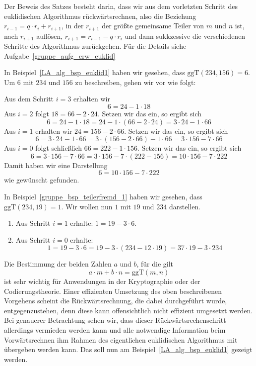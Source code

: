 Der Beweis des Satzes besteht darin, dass wir aus dem vorletzten Schritt des euklidischen Algorithmus 
rückwärtsrechnen, also die Beziehung $r_{i-1} = q \cdot r_i + r_{i+1}$, in der $r_{i+1}$ der größte 
gemeinsame Teiler von $m$ und $n$ ist, nach $r_{i+1}$ auflösen, $r_{i+1} = r_{i-1} - q \cdot r_i$ und dann 
sukkzessive die verschiedenen Schritte des Algorithmus zurückgehen. Für die Details siehe 
Aufgabe~\ref{gruppe_aufg_erw_euklid}

\begin{beispiel}
In Beispiel~\ref{LA_alg_bsp_euklid1} haben wir gesehen, dass $\mathrm{ggT}(234,156) = 6$. Um $6$ mit 
$234$ und $156$ zu beschreiben, gehen wir vor wie folgt: 

Aus dem Schritt $i = 3$ erhalten wir 
	$$ 6 = 24 - 1 \cdot 18 $$
Aus $i =2$ folgt $18 = 66 - 2 \cdot 24$. Setzen wir das ein, so ergibt sich 
	$$ 6 = 24 - 1 \cdot 18 = 24 - 1 \cdot (66 - 2 \cdot 24) = 3 \cdot 24 - 1 \cdot 66 $$
  Aus $i =1$ erhalten wir $24 = 156 - 2 \cdot 66$. Setzen wir das ein, so ergibt sich 
	$$ 6 = 3 \cdot 24 - 1 \cdot 66 = 3 \cdot (156 - 2 \cdot 66) - 1 \cdot 66 = 3 \cdot 156 - 7 \cdot 66 $$
Aus $i =0$ folgt schließlich  $66 = 222 - 1 \cdot 156$. Setzen wir das ein, so ergibt sich 
	$$ 6 = 3 \cdot 156 - 7 \cdot 66 = 3 \cdot 156 - 7 \cdot (222 - 156) = 10 \cdot 156 - 7 \cdot 222 $$
Damit haben wir eine Darstellung 
	$$ 6 = 10 \cdot 156 - 7 \cdot 222 $$
 wie gewünscht gefunden. 
\end{beispiel}

\begin{beispiel} In Beispiel~\ref{gruppe_bsp_teilerfremd_1} haben wir gesehen, dass $\textrm{ggT}(234, 19) = 1$. 
Wir wollen nun $1$ mit $19$ und $234$ darstellen.

\begin{enumerate}
\item Aus Schritt $i=1$ erhalte: $1 = 19 - 3 \cdot 6$.
\item Aus Schritt $i=0$ erhalte: 
  	$$1 = 19 - 3 \cdot 6 = 19 - 3 \cdot \left(234 - 12 \cdot 19\right) =
      37 \cdot 19 - 3 \cdot 234$$
\end{enumerate}
\end{beispiel}

\begin{notiz}
Die Bestimmung der beiden Zahlen $a$ und $b$, für die gilt 
	$$ a \cdot m + b \cdot n = \mathrm{ggT}(m,n) $$
ist sehr wichtig für Anwendungen in der Kryptographie oder der Codierungstheorie. Einer effizienten 
Umsetzung des oben beschreibenen Vorgehens scheint die Rückwärtsrechnung, die dabei durchgeführt 
wurde, entgegenzustehen, denn diese kann offensichtlich nicht effizient umgesetzt werden. Bei genauerer 
Betrachtung sehen wir, dass dieser Rückwärtsrechenschritt allerdings vermieden werden kann und alle 
notwendige Information beim Vorwärtsrechnen ihm Rahmen des eigentlichen euklidischen Algorithmus 
mit übergeben werden kann. Das soll nun am Beispiel~\ref{LA_alg_bsp_euklid1} gezeigt werden. 
\end{notiz}

